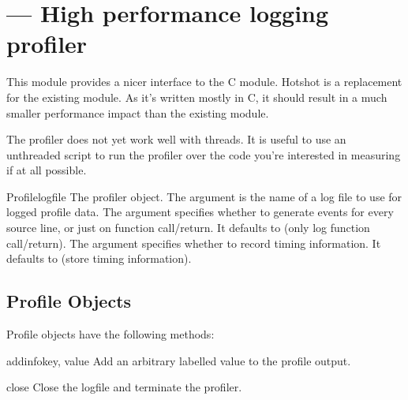 \section{ ---
         High performance logging profiler}




This module provides a nicer interface to the  C module.
Hotshot is a replacement for the existing  module. As it's
written mostly in C, it should result in a much smaller performance impact
than the existing  module.

\begin{notice}[warning]
  The  profiler does not yet work well with threads.
  It is useful to use an unthreaded script to run the profiler over
  the code you're interested in measuring if at all possible.
\end{notice}


\begin{classdesc}{Profile}{logfile}
The profiler object. The argument  is the name of a log
file to use for logged profile data. The argument 
specifies whether to generate events for every source line, or just on
function call/return. It defaults to  (only log function
call/return). The argument  specifies whether to
record timing information. It defaults to  (store timing
information).
\end{classdesc}


\subsection{Profile Objects \label{hotshot-objects}}

Profile objects have the following methods:

\begin{methoddesc}{addinfo}{key, value}
Add an arbitrary labelled value to the profile output.
\end{methoddesc}

\begin{methoddesc}{close}{}
Close the logfile and terminate the profiler.
\end{methoddesc}

